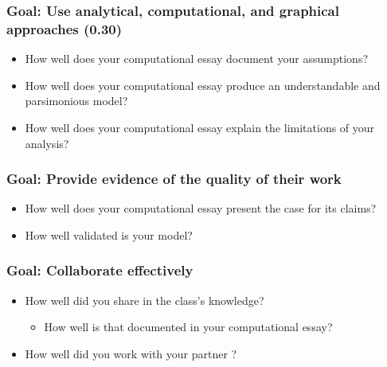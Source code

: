 \documentclass[letterpaper,10pt,english]{jupyterBook}
\begin{document}
\subsubsection{Goal: Use analytical, computational, and graphical approaches (0.30)}
\label{\detokenize{content/0_course/rubric:goal-use-analytical-computational-and-graphical-approaches-0-30}}\begin{itemize}
\item {} 
\sphinxAtStartPar
How well does your computational essay document your assumptions?

\item {} 
\sphinxAtStartPar
How well does your computational essay produce an understandable and parsimonious model?

\item {} 
\sphinxAtStartPar
How well does your computational essay explain the limitations of your analysis?

\end{itemize}


\subsubsection{Goal: Provide evidence of the quality of their work}
\label{\detokenize{content/0_course/rubric:goal-provide-evidence-of-the-quality-of-their-work}}\begin{itemize}
\item {} 
\sphinxAtStartPar
How well does your computational essay present  the case for its claims?

\item {} 
\sphinxAtStartPar
How well validated  is your model?

\end{itemize}


\subsubsection{Goal: Collaborate effectively}
\label{\detokenize{content/0_course/rubric:goal-collaborate-effectively}}\begin{itemize}
\item {} 
\sphinxAtStartPar
How well did you share  in the class’s knowledge?
\begin{itemize}
\item {} 
\sphinxAtStartPar
How well is that documented in your computational essay?

\end{itemize}

\item {} 
\sphinxAtStartPar
How well did you work with your partner ? 

\end{itemize}
\end{document}
